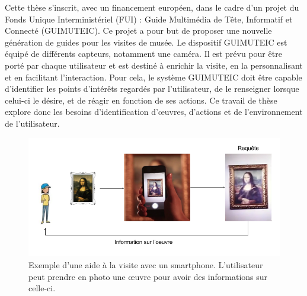 Cette thèse s'inscrit, avec un financement européen, dans le cadre d'un projet du Fonds Unique Interministériel (FUI) : Guide Multimédia de Tête, Informatif et Connecté (GUIMUTEIC).
Ce projet a pour but de proposer une nouvelle génération de guides pour les visites de musée.
Le dispositif GUIMUTEIC est équipé de différents capteurs, notamment une caméra.
Il est prévu pour être porté par chaque utilisateur et est destiné à enrichir la visite, en la personnalisant et en facilitant l'interaction.
Pour cela, le système GUIMUTEIC doit être capable d'identifier les points d'intérêts regardés par l'utilisateur, de le renseigner lorsque celui-ci le désire, et de réagir en fonction de ses actions.
Ce travail de thèse explore donc les besoins d'identification d'œuvres, d'actions et de l'environnement de l'utilisateur.




\begin{figure}%
\centering
\includegraphics[width=\textwidth]{figures/Requete.png}%
\caption{Exemple d'une aide à la visite avec un smartphone. L'utilisateur peut prendre en photo une œuvre pour avoir des informations sur celle-ci.}
\label{fig:exemplevisitesmartphone}%
\end{figure}

